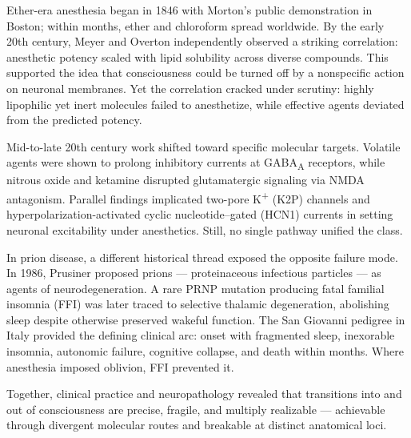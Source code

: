 \begin{historical}
Ether-era anesthesia began in 1846 with Morton’s public demonstration in Boston; within months, ether and chloroform spread worldwide. By the early 20th century, Meyer and Overton independently observed a striking correlation: anesthetic potency scaled with lipid solubility across diverse compounds. This supported the idea that consciousness could be turned off by a nonspecific action on neuronal membranes. Yet the correlation cracked under scrutiny: highly lipophilic yet inert molecules failed to anesthetize, while effective agents deviated from the predicted potency.

Mid-to-late 20th century work shifted toward specific molecular targets. Volatile agents were shown to prolong inhibitory currents at GABA\textsubscript{A} receptors, while nitrous oxide and ketamine disrupted glutamatergic signaling via NMDA antagonism. Parallel findings implicated two-pore K\textsuperscript{+} (K2P) channels and hyperpolarization-activated cyclic nucleotide–gated (HCN1) currents in setting neuronal excitability under anesthetics. Still, no single pathway unified the class.

In prion disease, a different historical thread exposed the opposite failure mode. In 1986, Prusiner proposed prions — proteinaceous infectious particles — as agents of neurodegeneration. A rare PRNP mutation producing fatal familial insomnia (FFI) was later traced to selective thalamic degeneration, abolishing sleep despite otherwise preserved wakeful function. The San Giovanni pedigree in Italy provided the defining clinical arc: onset with fragmented sleep, inexorable insomnia, autonomic failure, cognitive collapse, and death within months. Where anesthesia imposed oblivion, FFI prevented it.

Together, clinical practice and neuropathology revealed that transitions into and out of consciousness are precise, fragile, and multiply realizable — achievable through divergent molecular routes and breakable at distinct anatomical loci.
\end{historical}
